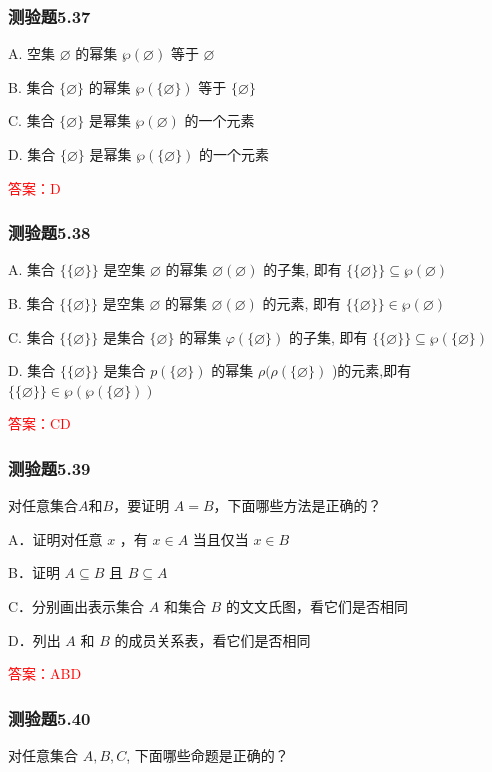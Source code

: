 \documentclass[UTF8, heading=true]{ctexart}
\begin{document}
\subsubsection{测验题5.37}
A. 
空集 $\varnothing$ 的幂集 $\wp(\varnothing)$ 等于 $\varnothing$

B. 
集合 $\{\varnothing\}$ 的幂集 $\wp(\{\varnothing\})$ 等于 $\{\varnothing\}$

C. 
集合 $\{\varnothing\}$ 是幂集 $\wp(\varnothing)$ 的一个元素

D. 
集合 $\{\varnothing\}$ 是幂集 $\wp(\{\varnothing\})$ 的一个元素

\textcolor{red}{答案：D}

\subsubsection{测验题5.38}
A. 
集合 $\{\{\varnothing\}\}$ 是空集 $\varnothing$ 的幂集 $\varnothing(\varnothing)$ 的子集, 即有 $\{\{\varnothing\}\} \subseteq \wp(\varnothing)$

B. 
集合 $\{\{\varnothing\}\}$ 是空集 $\varnothing$ 的幂集 $\varnothing(\varnothing)$ 的元素, 即有 $\{\{\varnothing\}\} \in \wp(\varnothing)$

C. 
集合 $\{\{\varnothing\}\}$ 是集合 $\{\varnothing\}$ 的幂集 $\varphi(\{\varnothing\})$ 的子集, 即有 $\{\{\varnothing\}\} \subseteq \wp(\{\varnothing\})$

D. 
集合 $\{\{\varnothing\}\}$ 是集合 $p(\{\varnothing\})$ 的幂集 $\rho(\rho(\{\varnothing\})$ )的元素,即有 $\{\{\varnothing\}\} \in \wp(\wp(\{\varnothing\}))$

\textcolor{red}{答案：CD}

\subsubsection{测验题5.39}

对任意集合$A$和$B$，要证明
$A=B$，下面哪些方法是正确的？

A．证明对任意 $x$ ，有 $x \in A$ 当且仅当 $x \in B$

B．证明 $A \subseteq B$ 且 $B \subseteq A$

C．分别画出表示集合 $A$ 和集合 $B$ 的文文氏图，看它们是否相同

D．列出 $A$ 和 $B$ 的成员关系表，看它们是否相同

\textcolor{red}{答案：ABD}

\subsubsection{测验题5.40}
对任意集合 $A, B, C$, 下面哪些命题是正确的？
\end{document}
